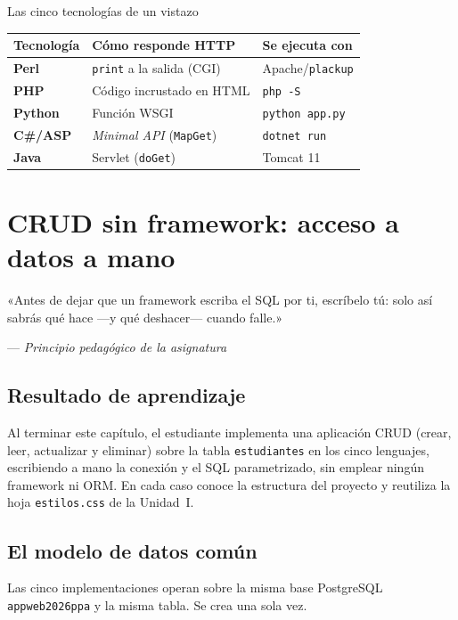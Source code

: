 \begin{cajacompara}{Las cinco tecnologías de un vistazo}
\small
\begin{tabular}{>{\bfseries}l l l}
\toprule
Tecnología & Cómo responde HTTP & Se ejecuta con \\
\midrule
Perl   & \texttt{print} a la salida (CGI) & Apache/\texttt{plackup} \\
PHP    & Código incrustado en HTML        & \texttt{php -S} \\
Python & Función WSGI                     & \texttt{python app.py} \\
C\#/ASP & \emph{Minimal API} (\texttt{MapGet}) & \texttt{dotnet run} \\
Java   & Servlet (\texttt{doGet})         & Tomcat 11 \\
\bottomrule
\end{tabular}
\end{cajacompara}

\chapter{CRUD sin framework: acceso a datos a mano}
\label{cap:crud}

\epigraph{«Antes de dejar que un framework escriba el SQL por ti,
escríbelo tú: solo así sabrás qué hace ---y qué deshacer--- cuando
falle.»}{--- \textit{Principio pedagógico de la asignatura}}

\section*{Resultado de aprendizaje}
Al terminar este capítulo, el estudiante implementa una aplicación CRUD
(crear, leer, actualizar y eliminar) sobre la tabla \texttt{estudiantes}
en los cinco lenguajes, escribiendo a mano la conexión y el SQL
parametrizado, sin emplear ningún framework ni ORM. En cada caso conoce
la estructura del proyecto y reutiliza la hoja \texttt{estilos.css} de la
Unidad~I.

\section{El modelo de datos común}
\label{sec:cap6:modelo}

Las cinco implementaciones operan sobre la misma base PostgreSQL
\texttt{appweb2026ppa} y la misma tabla. Se crea una sola vez.

